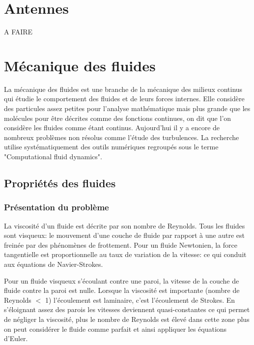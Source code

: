 \documentclass[10pt,a4paper]{article}
\begin{document}
\section{Antennes}
A FAIRE



\section{Mécanique des fluides}
La mécanique des fluides est une branche de la mécanique des milieux continus qui étudie le comportement des fluides et de leurs forces internes. Elle considère des particules assez petites pour l'analyse mathématique mais plus grande que les molécules pour être décrites comme des fonctions continues, on dit que l'on considère les fluides comme étant continus. Aujourd'hui il y a encore de nombreux problèmes non résolus comme l'étude des turbulences. La recherche utilise systématiquement des outils numériques regroupés sous le terme "Computational fluid dynamics".

\subsection{Propriétés des fluides}

\subsubsection{Présentation du problème \cite{intromecaflu}}
La viscosité d'un fluide est décrite par son nombre de Reynolds\cite{nbreynolds}. Tous les fluides sont visqueux: le mouvement d'une couche de fluide par rapport à une autre est freinée par des phénomènes de frottement. Pour un fluide Newtonien, la force tangentielle est proportionnelle au taux de variation de la vitesse: ce qui conduit aux équations de Navier-Strokes.

Pour un fluide visqueux s'écoulant contre une paroi, la vitesse de la couche de fluide contre la paroi est nulle. Lorsque la viscosité est importante (nombre de Reynolds $<$ 1) l'écoulement est laminaire, c'est l'écoulement de Strokes. En s'éloignant assez des parois les vitesses deviennent quasi-constantes ce qui permet de négliger la viscosité, plus le nombre de Reynolds est élevé dans cette zone plus on peut considérer le fluide comme parfait et ainsi appliquer les équations d'Euler.
\end{document}
